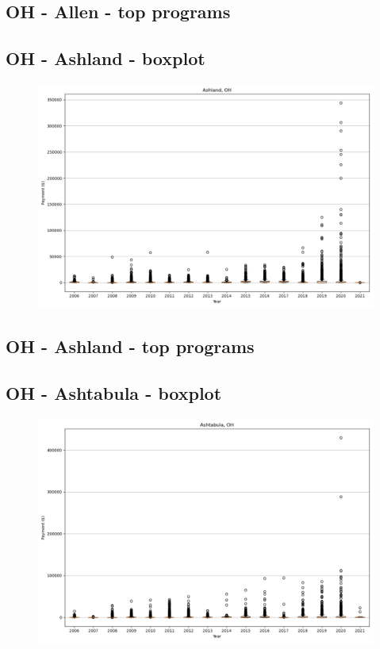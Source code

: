 \subsection*{OH - Allen - top programs}

\newpage
\subsection*{OH - Ashland - boxplot}
\begin{figure}[h]
\centering
\includegraphics[width=7in]{../output/boxplots/counties/Ashland-OH_boxplot.png}
\end{figure}


\subsection*{OH - Ashland - top programs}

\newpage
\subsection*{OH - Ashtabula - boxplot}
\begin{figure}[h]
\centering
\includegraphics[width=7in]{../output/boxplots/counties/Ashtabula-OH_boxplot.png}
\end{figure}


